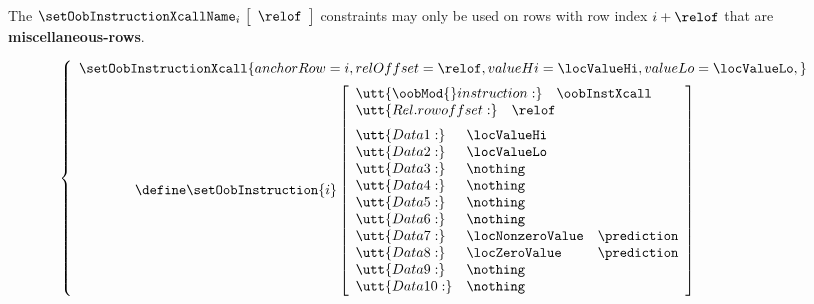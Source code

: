 \saNote{} The $\setOobInstructionXcallName  _{i} \big[ \, \relof \, \big]$ constraints may only be used on rows with row index $i + \relof$ that are \textbf{miscellaneous-rows}.

\[
        \left\{ \begin{array}{l}
                \setOobInstructionXcall {
                        anchorRow = i,
                        relOffset = \relof,
                        valueHi   = \locValueHi,
                        valueLo   = \locValueLo,
                }
                \vspace{2mm} \\
                \qquad \qquad \define
                \setOobInstruction{i}
                \left[ \begin{array}{llr}
                        \multicolumn{3}{l}{\utt{\oobMod{} instruction:} \quad \oobInstXcall}              \\
                        \multicolumn{3}{l}{\utt{Rel. row offset:}       \quad \relof}        \vspace{2mm} \\
                        \utt{Data 1:}  & \locValueHi      \\
                        \utt{Data 2:}  & \locValueLo      \\
                        \utt{Data 3:}  & \nothing         \\
                        \utt{Data 4:}  & \nothing         \\
                        \utt{Data 5:}  & \nothing         \\
                        \utt{Data 6:}  & \nothing         \\
                        \utt{Data 7:}  & \locNonzeroValue & \prediction \\
                        \utt{Data 8:}  & \locZeroValue    & \prediction \\
                        \utt{Data 9:}  & \nothing         \\
                        \utt{Data 10:} & \nothing         \\
                \end{array} \right] \\
        \end{array} \right.
\]
